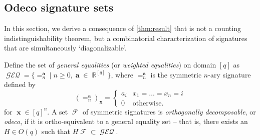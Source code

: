 \documentclass{article}
\DeclareMathOperator{\rr}{\mathbb{R}}
\DeclareMathOperator{\vx}{\mathbf{x}}
\DeclareMathOperator{\va}{\mathbf{a}}
\DeclareMathOperator{\fc}{\mathcal{F}}
\DeclareMathOperator{\geneq}{\mathcal{GEQ}}
\begin{document}
\subsection{Odeco signature sets}
In this section, we derive a consequence of \autoref{thm:result} that is not a counting
indistinguishability theorem,
but a combinatorial characterization of signatures that are simultaneously `diagonalizable'.
\begin{definition}[$\geneq$, odeco]
    Define the set of \emph{general equalities} (or \emph{weighted equalities}) on domain $[q]$ as
    $\geneq = \{=_n^{\va} \mid n \geq 0, \va \in \rr^{[q]}\}$, where $=_n^{\va}$ is the symmetric
    $n$-ary signature defined by
    \[
        (=_n^{\va})_{\vx} = \begin{cases} a_i & x_1 = \ldots = x_n = i \\ 0 & \text{otherwise}.
        \end{cases}
    \]
    for $\vx \in [q]^n$.
    A set $\fc$ of symmetric signatures is \emph{orthogonally decomposable}, or \emph{odeco}, if it is ortho-equivalent
    to a general equality set -- that is, there exists an $H \in O(q)$ such that $H\fc \subset \geneq$.
\end{definition}
\end{document}
